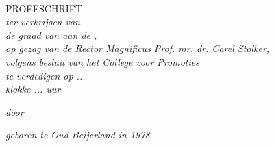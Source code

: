 \documentclass[11pt, a4paper, oneside]{Thesis} %
\title{\ttitle} %
\begin{document}
\frontmatter %


\fancyhead{} %
\rhead{\thepage} %
\lhead{} %

\pagestyle{fancy} %

\newcommand{\HRule}{\rule{\linewidth}{0.5mm}} %

\hypersetup{pdfsubject=\subjectname}
\hypersetup{pdfauthor=\authornames}
\hypersetup{pdfkeywords=\keywordnames}


\begin{titlepage}
\begin{center}

{\huge \bfseries \ttitle}\\[0.4cm] %

\textsc{\Large PROEFSCHRIFT}\\[0.5cm] %

\large \textit{ter verkrijgen van\\
de graad van \degreename{} aan de \univname,\\
op gezag van de Rector Magnificus Prof. mr. dr. Carel Stolker,\\
volgens besluit van het College voor Promoties\\
te verdedigen op ...\\
klokke ... uur}

\large \textit{door}

\authornames

\large \textit{geboren te Oud-Beijerland in 1978}
 
\vfill
\end{center}

\end{titlepage}

\end{document}
